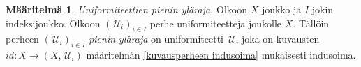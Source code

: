 \documentclass[12pt,a4paper,leqno]{report}
\newcommand{\N}{\mathbb{N}}
\newcommand{\U}{\,\mathcal{U}}
\theoremstyle{plain}
\theoremstyle{definition}
\newtheorem{maar}[equation]{Määritelmä}
\theoremstyle{remark}
\begin{document}
\begin{maar}
\emph{Uniformiteettien pienin yläraja.}
Olkoon $X$ joukko ja $I$ jokin indeksijoukko.
Olkoon $(\U_i)_{i\in I}$ perhe uniformiteetteja joukolle $X$.
Tällöin perheen $(\U_i)_{i\in I}$ \emph{pienin yläraja} on uniformiteetti $\U$, joka on kuvausten $id\colon X\rightarrow (X,\U_i)$ määritelmän \ref{kuvausperheen indusoima} mukaisesti indusoima.
\end{maar}
\end{document}
